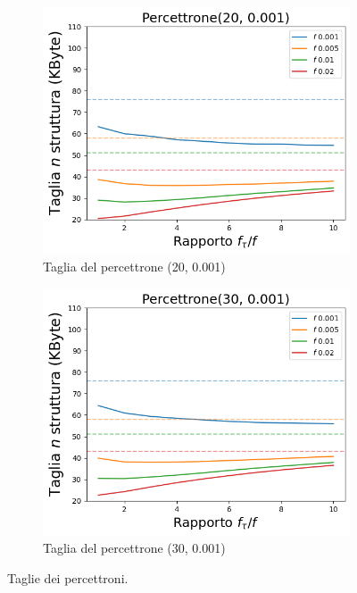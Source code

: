 \documentclass[../../main.tex]{subfiles}
\begin{document}
    \begin{figure}[H]
        \centering
        \begin{subfigure}[b]{0.49\textwidth}
            \centering
            \includegraphics[width = \textwidth]{immagini/7/SLBF/Percettrone(20, 0.001)_Taglia.png}
            \caption{Taglia del percettrone (20, 0.001)}
            \label{fig:SLBFTagliaPercettrone20}
        \end{subfigure}
        \begin{subfigure}[b]{0.49\textwidth}
            \centering
            \includegraphics[width = \textwidth]{immagini/7/SLBF/Percettrone(30, 0.001)_Taglia.png}
            \caption{Taglia del percettrone (30, 0.001)}
            \label{fig:SLBFTagliaPercettrone30}
        \end{subfigure}
        \caption{Taglie dei percettroni.}
        \label{fig:tagliePercettroniSLBF}
    \end{figure}
\end{document}
